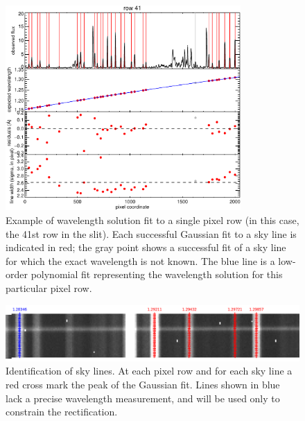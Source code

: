 \documentclass[a4paper]{article}
\begin{document}
\begin{sloppypar}
\begin{figure}[tbp]
\centering
\includegraphics[width=0.8\textwidth]{row41}
\caption{Example of wavelength solution fit to a single pixel row (in this case, the 41st row in the slit). Each successful Gaussian fit to a sky line is indicated in red; the gray point shows a successful fit of a sky line for which the exact wavelength is not known. The blue line is a low-order polynomial fit representing the wavelength solution for this particular pixel row.}
\label{fig:wavecal_onerow}
\end{figure}

\begin{figure}[tbp]
\centering
\includegraphics[width=\textwidth]{speclines.png}
\caption{Identification of sky lines. At each pixel row and for each sky line a red cross mark the peak of the Gaussian fit. Lines shown in blue lack a precise wavelength measurement, and will be used only to constrain the rectification.}
\label{fig:speclines}
\end{figure}



\end{sloppypar}
\end{document}
